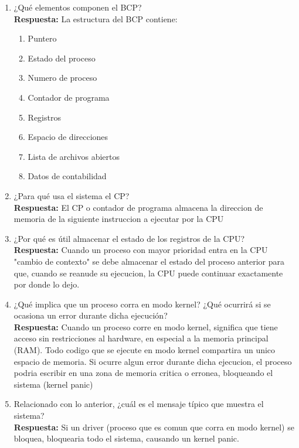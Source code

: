 \documentclass[a4paper,12pt]{article}
\begin{document}
\begin{enumerate}[label=\textbf{Pregunta \arabic*.}]
    \item ¿Qué elementos componen el BCP? \\
    \textbf{Respuesta:} %
    La estructura del BCP contiene:
    \begin{enumerate}
        \item Puntero
        \item Estado del proceso
        \item Numero de proceso
        \item Contador de programa
        \item Registros
        \item Espacio de direcciones
        \item Lista de archivos abiertos
        \item Datos de contabilidad
    \end{enumerate}

    \item ¿Para qué usa el sistema el CP? \\ %
    \textbf{Respuesta:} 
    El CP o contador de programa almacena la direccion de memoria de la siguiente instruccion a ejecutar por la CPU

    \item ¿Por qué es útil almacenar el estado de los registros de la CPU? \\ %
    \textbf{Respuesta:} 
    Cuando un proceso con mayor prioridad entra en la CPU "cambio de contexto" se debe almacenar el estado del proceso anterior para que, cuando se reanude su ejecucion, la CPU puede continuar exactamente por donde lo dejo.

    \item ¿Qué implica que un proceso corra en modo kernel? ¿Qué ocurrirá si se ocasiona un error durante dicha ejecución? \\ %
    \textbf{Respuesta:} 
    Cuando un proceso corre en modo kernel, significa que tiene acceso sin restricciones al hardware, en especial a la memoria principal (RAM). Todo codigo que se ejecute en modo kernel compartira un unico espacio de memoria. Si ocurre algun error durante dicha ejecucion, el proceso podria escribir en una zona de memoria critica o erronea, bloqueando el sistema (kernel panic)

    \item Relacionado con lo anterior, ¿cuál es el mensaje típico que muestra el sistema? \\ %
    \textbf{Respuesta:} 
    Si un driver (proceso que es comun que corra en modo kernel) se bloquea, bloquearia todo el sistema, causando un kernel panic.


\end{enumerate}
\end{document}
